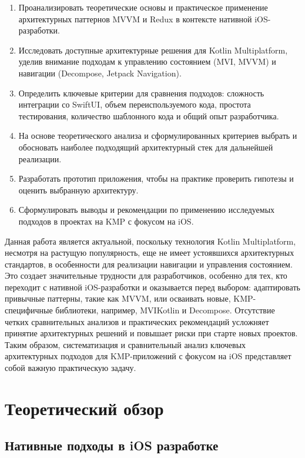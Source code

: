 \documentclass[14pt, russian]{scrartcl}
\begin{document}
\begin{enumerate}
    \item Проанализировать теоретические основы и практическое применение архитектурных паттернов MVVM и Redux в контексте нативной iOS-разработки.
    \item Исследовать доступные архитектурные решения для Kotlin Multiplatform, уделив внимание подходам к управлению состоянием (MVI, MVVM) и навигации (Decompose, Jetpack Navigation).
    \item Определить ключевые критерии для сравнения подходов: сложность интеграции со SwiftUI, объем переиспользуемого кода, простота тестирования, количество шаблонного кода и общий опыт разработчика.
    \item На основе теоретического анализа и сформулированных критериев выбрать и обосновать наиболее подходящий архитектурный стек для дальнейшей реализации.
    \item Разработать прототип приложения, чтобы на практике проверить гипотезы и оценить выбранную архитектуру.
    \item Сформулировать выводы и рекомендации по применению исследуемых подходов в проектах на KMP с фокусом на iOS.
\end{enumerate}

Данная работа является актуальной, поскольку технология Kotlin Multiplatform, несмотря на растущую популярность, еще не имеет устоявшихся архитектурных стандартов, в особенности для реализации навигации и управления состоянием. Это создает значительные трудности для разработчиков, особенно для тех, кто переходит с нативной iOS-разработки и оказывается перед выбором: адаптировать привычные паттерны, такие как MVVM, или осваивать новые, KMP-специфичные библиотеки, например, MVIKotlin и Decompose. Отсутствие четких сравнительных анализов и практических рекомендаций усложняет принятие архитектурных решений и повышает риски при старте новых проектов. Таким образом, систематизация и сравнительный анализ ключевых архитектурных подходов для KMP-приложений с фокусом на iOS представляет собой важную практическую задачу.


\section{Теоретический обзор}

\subsection{Нативные подходы в iOS разработке}
\end{document}
